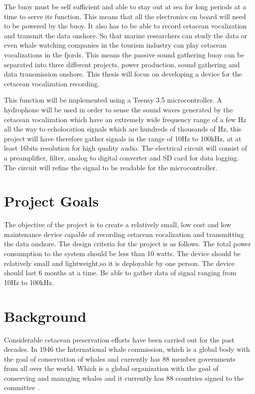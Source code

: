 The buoy must be self sufficient and able to stay out at sea for long periods at a time to serve its function.
This means that all the electronics on board will need to be powered by the buoy.
It also has to be able to record cetacean vocalization and transmit the data onshore.
So that marine researchers can study the data or even whale watching companies in the tourism industry can play cetacean vocalizations in the fjords.
This means the passive sound gathering buoy can be separated into three different projects, power production, sound gathering and data transmission onshore.
This thesis will focus on developing a device for the cetacean vocalization recording.

This function will be implemented using a Teensy 3.5 microcontroller.
A hydrophone will be used in order to sense the sound waves generated by the cetacean vocalization which have an extremely wide frequency range of a few Hz all the way to echolocation signals which are hundreds of thousands of Hz, this project will have therefore gather signals in the range of 10Hz to 100kHz, at at least 16bits resolution for high quality audio.
The electrical circuit will consist of a preamplifier, filter, analog to digital converter and SD card for data logging.
The circuit will refine the signal to be readable for the microcontroller. 


\section{Project Goals}

The objective of the project is to create a relatively small, low cost and low maintenance device capable of recording cetacean vocalization and transmitting the data onshore.
The design criteria for the project is as follows.
The total power consumption to the system should be less than 10 watts. 
The device should be relatively small and lightweight,so it is deployable by one person.
The device should last 6 months at a time.
Be able to gather data of signal ranging from 10Hz to 100kHz.
\clearpage

\section{Background}

Considerable cetacean preservation efforts have been carried out for the past decades.
In 1946 the International whale commission, which is a global body with the goal of conservation of whales and currently has 88 member governments from all over the world.
Which is a global organization with the goal of conserving and managing whales and it currently has 88 countries signed to the committee \cite{noauthor_iwc_nodate}.

